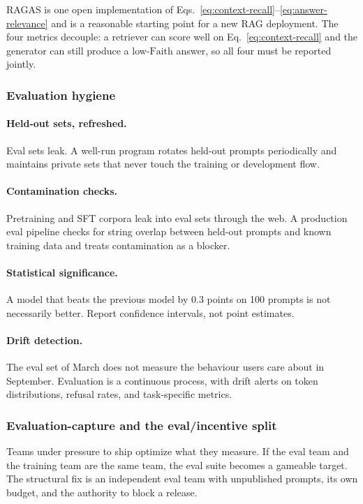 RAGAS \citep{es2024ragas} is one open implementation of
Eqs.~\eqref{eq:context-recall}--\eqref{eq:answer-relevance} and is
a reasonable starting point for a new RAG deployment. The four
metrics decouple: a retriever can score well on
Eq.~\eqref{eq:context-recall} and the generator can still produce
a low-$\mathrm{Faith}$ answer, so all four must be reported
jointly.

\subsubsection{Evaluation hygiene}

\paragraph{Held-out sets, refreshed.}
Eval sets leak. A well-run program rotates held-out prompts
periodically and maintains private sets that never touch the
training or development flow.

\paragraph{Contamination checks.} Pretraining and SFT corpora
leak into eval sets through the web. A production eval pipeline
checks for string overlap between held-out prompts and known
training data and treats contamination as a blocker.

\paragraph{Statistical significance.} A model that beats the
previous model by 0.3 points on 100 prompts is not necessarily
better. Report confidence intervals, not point estimates.

\paragraph{Drift detection.} The eval set of March does not
measure the behaviour users care about in September. Evaluation is
a continuous process, with drift alerts on token distributions,
refusal rates, and task-specific metrics.

\subsubsection{Evaluation-capture and the eval/incentive split}

Teams under pressure to ship optimize what they measure. If the
eval team and the training team are the same team, the eval suite
becomes a gameable target. The structural fix is an independent
eval team with unpublished prompts, its own budget, and the
authority to block a release.

